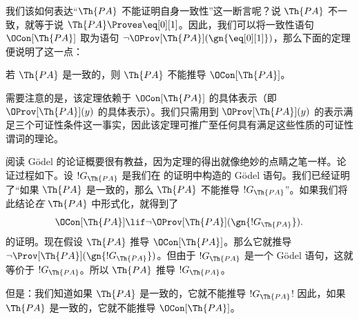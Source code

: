 \documentclass[../../../include/open-logic-section]{subfiles}
\begin{document}


我们该如何表达“$\Th{PA}$ 不能证明自身一致性”这一断言呢？说 $\Th{PA}$ 不一致，就等于说 $\Th{PA} \Proves \eq[0][1]$。因此，我们可以将一致性语句 $\OCon[\Th{PA}]$ 取为语句 $\lnot
\OProv[\Th{PA}](\gn{\eq[0][1]})$，那么下面的定理便说明了这一点：

\begin{thm}
若 $\Th{PA}$ 是一致的，则 $\Th{PA}$ 不能推导 $\OCon[\Th{PA}]$。
\end{thm}

需要注意的是，该定理依赖于 $\OCon[\Th{PA}]$ 的具体表示（即 $\OProv[\Th{PA}](y)$ 的具体表示）。我们只需用到 $\OProv[\Th{PA}](y)$ 的表示满足三个可证性条件这一事实，因此该定理可推广至任何具有满足这些性质的可证性谓词的理论。

阅读 Gödel 的论证概要很有教益，因为定理的得出就像绝妙的点睛之笔一样。论证过程如下。设 $!G_{\Th{PA}}$ 是我们在  的证明中构造的 Gödel 语句。我们已经证明了“如果 $\Th{PA}$ 是一致的，那么 $\Th{PA}$ 不能推导 $!G_{\Th{PA}}$”。如果我们将此结论\emph{在} $\Th{PA}$ 中形式化，就得到了 \[
\OCon[\Th{PA}] \lif \lnot \OProv[\Th{PA}](\gn{!G_{\Th{PA}}}).
\] 的证明。现在假设 $\Th{PA}$ 推导 $\OCon[\Th{PA}]$。那么它就推导 $\lnot
\Prov[\Th{PA}](\gn{!G_{\Th{PA}}})$。但由于 $!G_{\Th{PA}}$ 是一个 Gödel 语句，这就等价于 $!G_{\Th{PA}}$。所以 $\Th{PA}$ 推导 $!G_{\Th{PA}}$。

但是：我们知道如果 $\Th{PA}$ 是一致的，它就不能推导 $!G_{\Th{PA}}$!{} 因此，如果 $\Th{PA}$ 是一致的，它就不能推导 $\OCon[\Th{PA}]$。
\end{document}
